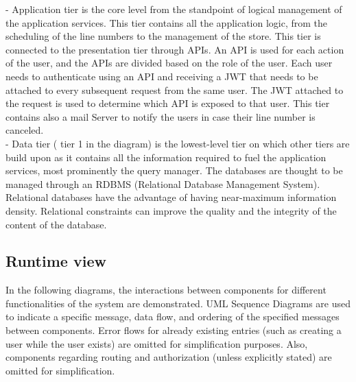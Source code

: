 - Application tier is the core level from the standpoint of logical management of the application services.
This tier contains all the application logic, from the scheduling of the line numbers to the management of the store.
This tier is connected to the presentation tier through APIs.
An API is used for each action of the user, and the APIs are divided based on the role of the user.
Each user needs to authenticate using an API and receiving a JWT that needs to be attached to every subsequent request from the same user.
The JWT attached to the request is used to determine which API is exposed to that user.
This tier contains also a mail Server to notify the users in case their line number is canceled. \\

- Data tier ( tier 1 in the diagram) is the lowest-level tier on which other tiers are build upon as it contains all the information required to fuel the application services, most prominently the query manager. The databases are thought to be managed through an RDBMS
(Relational Database Management System).
Relational databases have the advantage of having near-maximum information density.
Relational constraints can improve the quality and the integrity of the content of the database.

\subsection{Runtime view}

In the following diagrams, the interactions between components for different functionalities of the system are demonstrated.
UML Sequence Diagrams are used to indicate a specific message, data flow, and ordering of the specified messages between components.
Error flows for already existing entries (such as creating a user while the user exists) are omitted for simplification purposes.
Also, components regarding routing and authorization (unless explicitly stated) are omitted for simplification.

